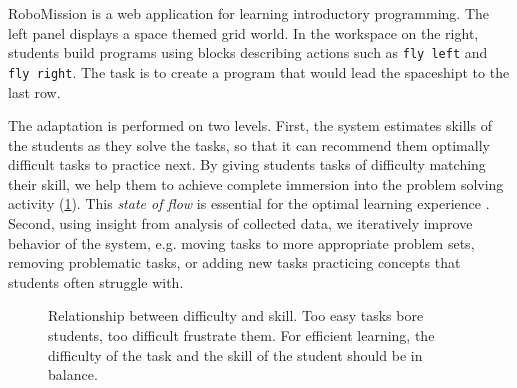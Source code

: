 
%
  {RoboMission is a web application for learning introductory programming.
   The left panel displays a space themed grid world. In the workspace on
   the right, students build programs using blocks describing actions
   such as \texttt{fly left} and \texttt{fly right}.
   The task is to create a program that would lead the spaceshipt to the last row.}

The adaptation is performed on two levels. %
First, the system estimates skills of the students as they solve the tasks,
so that it can recommend them optimally difficult tasks to practice next.
By giving students tasks of difficulty matching their skill,
we help them to achieve complete immersion into the problem solving
activity (\cref{fig:flow}).
This \emph{state of flow} \cite{flow}
is essential for the optimal learning experience
\cite{adaptive-practice}.
Second, using insight from analysis of collected data,
we iteratively improve behavior of the system,
e.g. moving tasks to more appropriate problem sets,
removing problematic tasks,
or adding new tasks practicing concepts that students often struggle with.


\begin{figure}[htb]
  \centering
  \caption{
    Relationship between difficulty and skill.
    Too easy tasks bore students, too difficult frustrate them.
    For efficient learning, the difficulty of the task
    and the skill of the student should be in balance.
  }
  \label{fig:flow}
\end{figure}


